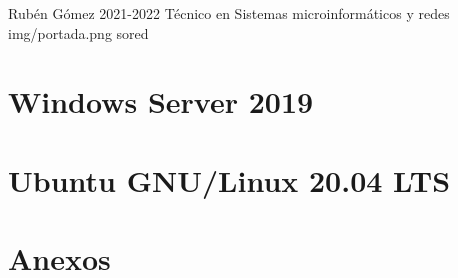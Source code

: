 \documentclass{../../../yukibook.cls/yukibook}
\begin{document}
  {Rubén Gómez}  %
  {2021-2022}    %
  {Técnico en Sistemas microinformáticos y redes} %
  {}	%
  {}	%
  {img/portada.png} %
  {sored} %

\part{Windows Server 2019}
\graphicspath{{img/windows/}}


\part{Ubuntu GNU/Linux 20.04 LTS}
\graphicspath{{img/linux/}}


\part{Anexos}

\graphicspath{{../../../anexos/instalar_ubuntu_lts/}}


\graphicspath{{../../../anexos/ubuntu_raid1/}}


\graphicspath{{../../../anexos/gestion_backups/}}


\graphicspath{{../../../anexos/sistemas_monitorizacion/}}


\graphicspath{{../../../anexos/monitorizacion_munin/}}


\graphicspath{{../../../anexos/virtualbox_networking/}}


\graphicspath{{../../../anexos/}}

\end{document}
